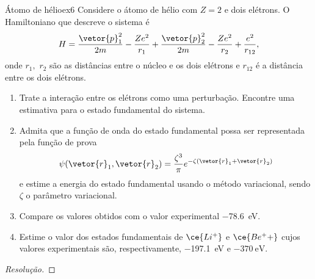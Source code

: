 \begin{exercício}{Átomo de hélio}{ex6}
   Considere o átomo de hélio com \(Z = 2\) e dois elétrons. O Hamiltoniano que descreve o sistema é
   \begin{equation*}
      H = \frac{\vetor{p}_1^2}{2m} - \frac{Ze^2}{r_1} + \frac{\vetor{p}_2^2}{2m} - \frac{Z e^2}{r_2} + \frac{e^2}{r_{12}},
   \end{equation*}
   onde \(r_1,\) \(r_2\) são as distâncias entre o núcleo e os dois elétrons e \(r_{12}\) é a distância entre os dois elétrons.
   \begin{enumerate}[label=(\alph*)]
       \item Trate a interação entre os elétrons como uma perturbação. Encontre uma estimativa para o estado fundamental do sistema.
       \item Admita que a função de onda do estado fundamental possa ser representada pela função de prova
          \begin{equation*}
             \psi(\vetor{r}_1, \vetor{r}_2) = \frac{\zeta^3}{\pi} e^{- \zeta(\vetor{r}_1 + \vetor{r}_2)}
          \end{equation*}
          e estime a energia do estado fundamental usando o método variacional, sendo \(\zeta\) o parâmetro variacional.
       \item Compare os valores obtidos com o valor experimental \SI{-78.6}{\eV}.
       \item Estime o valor dos estados fundamentais de \(\ce{Li^+}\) e \(\ce{Be^++}\) cujos valores experimentais são, respectivamente, \SI{-197.1}{\eV} e \(\SI{-370}{\eV}.\)
   \end{enumerate}
\end{exercício}
\begin{proof}[Resolução]
    
\end{proof}
